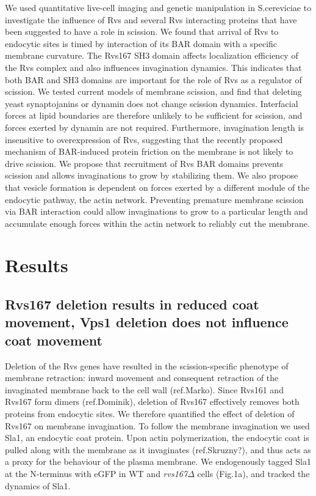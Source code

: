 \documentclass[9pt,lineno]{elife}
\begin{document}
We used quantitative live-cell imaging and genetic manipulation in S.cereviciae to investigate the influence of Rvs and several Rvs interacting proteins that have been suggested to have a role in scission. We found that arrival of Rvs to endocytic sites is timed by interaction of its BAR domain with a specific membrane curvature. The Rvs167 SH3 domain affects localization efficiency of the Rvs complex and also influences invagination dynamics. This indicates that both BAR and SH3 domains are important for the role of Rvs as a regulator of scission. We tested current models of membrane scission, and find that deleting yeast synaptojanins or dynamin does not change scission dynamics. Interfacial forces at lipid boundaries are therefore unlikely to be sufficient for scission, and forces exerted by dynamin are not required. Furthermore, invagination length is insensitive to overexpression of Rvs, suggesting that the recently proposed mechanism of BAR-induced protein friction on the membrane is not likely to drive scission. We propose that recruitment of Rvs BAR domains prevents scission and allows invaginations to grow by stabilizing them. We also propose that vesicle formation is dependent on forces exerted by a different module of the endocytic pathway, the actin network. Preventing premature membrane scission via BAR interaction could allow invaginations to grow to a particular length and accumulate enough forces within the actin network to reliably cut the membrane. 


\section{Results}

\subsection{Rvs167 deletion results in reduced coat movement, Vps1 deletion does not influence coat movement}
Deletion of the Rvs genes have resulted in the scission-specific phenotype of membrane retraction: inward movement and consequent retraction of the invaginated membrane back to the cell wall (ref.Marko). Since Rvs161 and Rvs167 form dimers (ref.Dominik), deletion of Rvs167 effectively removes both proteins from endocytic sites. We therefore quantified the effect of deletion of Rvs167 on membrane invagination. To follow the membrane invagination we used Sla1, an endocytic coat protein. Upon actin polymerization, the endocytic coat is pulled along with the membrane as it invaginates (ref.Skruzny?), and thus acts as a proxy for the behaviour of the plasma membrane. We endogenously tagged Sla1 at the N-terminus with eGFP in WT and \textit{rvs167$\Delta$} cells (Fig.1a), and tracked the dynamics of Sla1.
\end{document}
